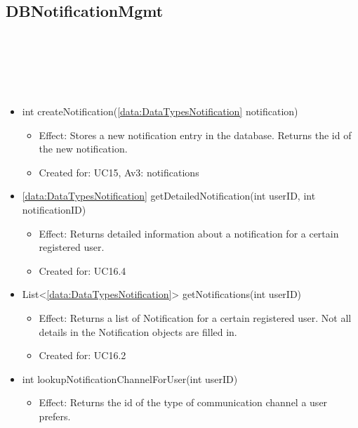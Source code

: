   \subsection{DBNotificationMgmt}\label{int:OtherDataDatabaseOtherDataDBDBNotificationMgmt}
    \begin{description}
      \item[Provided by:] \iconcomponent{}~
      \item[Required by:] \iconcomponent{}~
      \item[Operations:] ~
    \begin{itemize}[noitemsep,nolistsep,leftmargin=-.25cm]
      \item \textsf{int createNotification(\ref{data:DataTypesNotification} notification)}
        \begin{itemize}[noitemsep,nolistsep]
           \item Effect: Stores a new notification entry in the database. Returns the id of the new notification.
\item Created for: UC15, Av3: notifications
        \end{itemize}
      \item \textsf{\ref{data:DataTypesNotification} getDetailedNotification(int userID, int notificationID)}
        \begin{itemize}[noitemsep,nolistsep]
           \item Effect: Returns detailed information about a notification for a certain registered user.
\item Created for: UC16.4
        \end{itemize}
      \item \textsf{List\textless{}\ref{data:DataTypesNotification}\textgreater{} getNotifications(int userID)}
        \begin{itemize}[noitemsep,nolistsep]
           \item Effect: Returns a list of Notification for a certain registered user. Not all details in the Notification objects are filled in.
\item Created for: UC16.2
        \end{itemize}
      \item \textsf{int lookupNotificationChannelForUser(int userID)}
        \begin{itemize}[noitemsep,nolistsep]
           \item Effect: Returns the id of the type of communication channel a user prefers.

\end{itemize}
\end{itemize}
\end{description}
